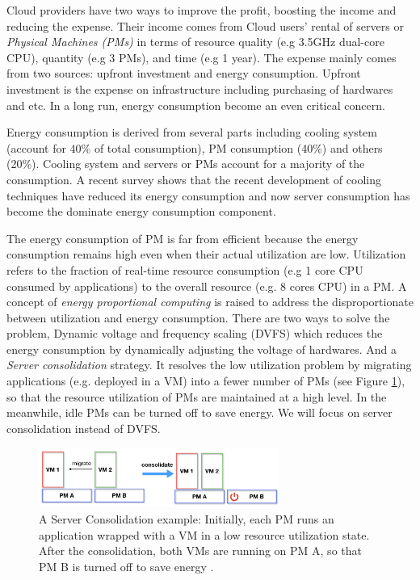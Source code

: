 Cloud providers have two ways to improve the profit,
boosting the income and reducing the expense. Their income comes from Cloud users' rental of servers or \emph{Physical Machines (PMs)} in terms of resource quality (e.g  3.5GHz dual-core CPU), quantity (e.g 3 PMs), and time (e.g 1 year). The expense mainly comes from two sources: upfront investment and energy consumption. Upfront investment is the expense on infrastructure including purchasing of hardwares and etc.
In a long run, energy consumption become an even critical concern.


Energy consumption \cite{Kaplan:up01fR-k} is derived from several parts including cooling system (account for 40\% of total consumption), PM consumption (40\%) and others (20\%).
 Cooling system and servers or PMs account for a majority of the consumption. A recent survey \cite{Cho:2016kz} shows that the recent development of cooling techniques have reduced its energy consumption and now server consumption has become the dominate energy consumption component. 


The energy consumption of PM is far from efficient \cite{Hameed:2016cma} because the energy consumption remains high even when their actual utilization are low. Utilization refers to the fraction of real-time resource consumption (e.g 1 core CPU consumed by applications) to the overall resource (e.g. 8 cores CPU) in a PM. A concept of \emph{energy proportional computing} \cite{Barroso:2007jt} is raised to address the disproportionate between utilization and energy consumption. There are two ways to solve the problem, Dynamic voltage and frequency scaling (DVFS)
which reduces the energy consumption by dynamically adjusting the voltage of hardwares. And a \emph{Server consolidation} \cite{Zhang:2010vo} strategy. It resolves the low utilization problem by migrating applications (e.g. deployed in a VM) into a fewer number of PMs (see Figure \ref{fig:consolidation}), so that the resource utilization of PMs are maintained at a high level. In the meanwhile, idle PMs can be turned off to save energy. We will focus on server consolidation instead of DVFS.

\begin{figure}
	\centering
	\includegraphics[width=0.7\textwidth]{pics/consolidate.png}
	\caption{A Server Consolidation example: Initially, each PM runs an application wrapped with a VM in a low resource utilization state. After the consolidation, both VMs are running on PM A, so that PM B is turned off to save energy \cite{Barroso:2007jt}.}
	\label{fig:consolidation}
\end{figure}

